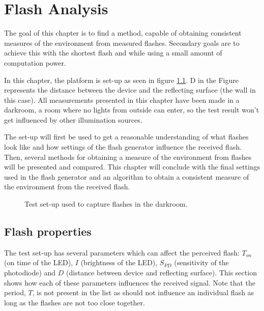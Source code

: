 \chapter{Flash Analysis}
\label{chp:Flash_Analysis}


The goal of this chapter is to find a method, capable of obtaining consistent measures of the environment from measured flashes. Secondary goals are to achieve this with the shortest flash and while using a small amount of computation power.

In this chapter, the platform is set-up as seen in figure \ref{fig:Flashcapturing}. 
D in the Figure represents the distance between the device and the reflecting surface (the wall in this case). All measurements presented in this chapter have been made in a darkroom, a room where no lights from outside can enter, so the test result won't get influenced by other illumination sources.
 
The set-up will first be used to get a reasonable understanding of what flashes look like and how settings of the flash generator influence the received flash. Then, several methods for obtaining a measure of the environment from flashes will be presented and compared. This chapter will conclude with the final settings used in the flash generator and an algorithm to obtain a consistent measure of the environment from the received flash.
\begin{figure}
	\centering     %
	\caption{Test set-up used to capture flashes in the darkroom.\label{fig:Flashcapturing}}
\end{figure}

\section{Flash properties}
\label{sec:Flash_generator}
The test set-up has several parameters which can affect the perceived flash: $T_{on}$ (on time of the LED), $I$ (brightness of the LED), $S_{PD}$ (sensitivity of the photodiode) and $D$ (distance between device and reflecting surface). This section shows how each of these parameters influences the received signal. Note that the period, $T$, is not present in the list as should not influence an individual flash as long as the flashes are not too close together.

